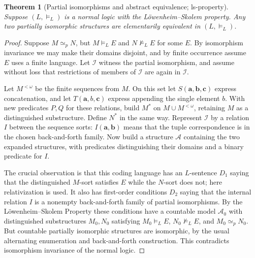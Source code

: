 \documentclass[UTF8,11pt]{ctexart}
\newtheorem*{theorem}{Theorem}
\theoremstyle{definition}
\begin{document}
\begin{theorem}[Partial isomorphisms and abstract equivalence; ls-property]
Suppose $(L,\models_L)$ is a normal logic with the L\"owenheim--Skolem
property. Any two partially isomorphic structures are elementarily
equivalent in $(L,\models_L)$.
\end{theorem}
\begin{proof}
Suppose $M\simeq_pN$, but $M\models_LE$ and $N\not\models_LE$ for some
$E$. By isomorphism invariance we may make their domains disjoint, and
by finite occurrence assume $E$ uses a finite language.
Let $\mathcal I$ witness the partial isomorphism, and assume without loss
that restrictions of members of $\mathcal I$ are again in $\mathcal I$.

Let $M^{<\omega}$ be the finite sequences from $M$. On this set let
$S(\mathbf a,\mathbf b,\mathbf c)$ express concatenation, and let
$T(\mathbf a,b,\mathbf c)$ express appending the single element $b$.
With new predicates $P,Q$ for these relations, build $M^*$ on
$M\cup M^{<\omega}$, retaining $M$ as a distinguished substructure.
Define $N^*$ in the same way.
Represent $\mathcal I$ by a relation $I$ between the sequence sorts:
$I(\mathbf a,\mathbf b)$ means that the tuple correspondence is in the
chosen back-and-forth family.
Now build a structure $\mathcal A$ containing the two expanded structures,
with predicates distinguishing their domains and a binary predicate for $I$.

\begin{center}
\end{center}
The crucial observation is that this coding language has an $L$-sentence
$D_1$ saying that the distinguished $M$-sort satisfies $E$ while the
$N$-sort does not; here relativization is used. It also has first-order
conditions $D_2$ saying that the internal relation $I$ is a nonempty
back-and-forth family of partial isomorphisms. By the
L\"owenheim--Skolem Property these conditions have a countable model
$\mathcal A_0$ with distinguished substructures $M_0,N_0$ satisfying
$M_0\models_LE$, $N_0\not\models_LE$, and $M_0\simeq_pN_0$.
But countable partially isomorphic structures are isomorphic, by the
usual alternating enumeration and back-and-forth construction.
This contradicts isomorphism invariance of the normal logic.
\end{proof}
\end{document}

